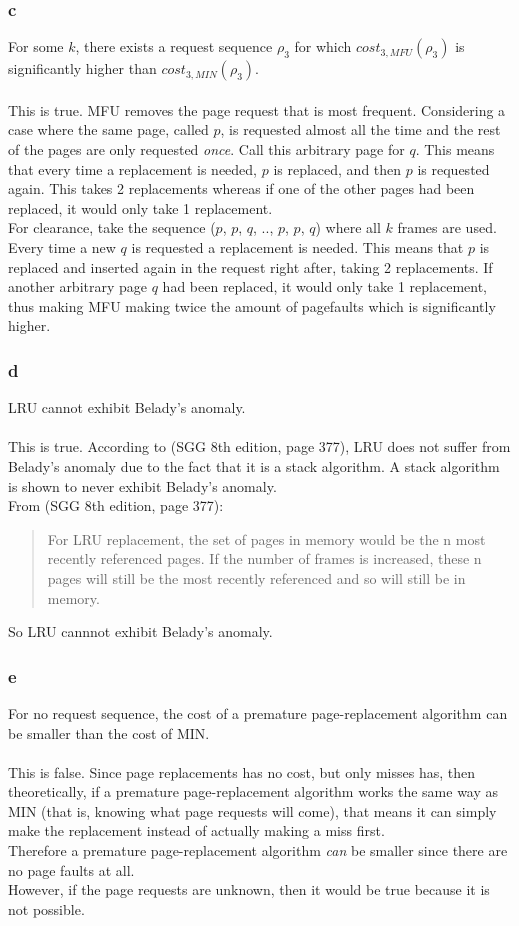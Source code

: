 \documentclass[12pt]{article}
\begin{document}
\subsubsection{c}
For some $k$, there exists a request sequence $\rho_3$ for which $cost_{3,MFU}(\rho_3)$ is significantly higher than $cost_{3,MIN}(\rho_3)$.\\
\\
This is true. MFU removes the page request that is most frequent. Considering a case where the same page, called $p$, is requested almost all the time and the rest of the pages are only requested \textit{once}. Call this arbitrary page for $q$. This means that every time a replacement is needed, $p$ is replaced, and then $p$ is requested again. This takes 2 replacements whereas if one of the other pages had been replaced, it would only take 1 replacement.\\
For clearance, take the sequence ($p$, $p$, $q$, .., $p$, $p$, $q$)  where all $k$ frames are used. Every time a new $q$ is requested a replacement is needed. This means that $p$ is replaced and inserted again in the request right after, taking 2 replacements. If another arbitrary page $q$ had been replaced, it would only take 1 replacement, thus making MFU making twice the amount of pagefaults which is significantly higher.

\subsubsection{d}
LRU cannot exhibit Belady's anomaly.\\
\\
This is true. According to (SGG 8th edition, page 377), LRU does not suffer from Belady's anomaly due to the fact that it is a stack algorithm. A stack algorithm is shown to never exhibit Belady's anomaly.\\
From (SGG 8th edition, page 377):
\begin{quote}
For LRU replacement, the set of pages in memory would be the n most
recently referenced pages. If the number of frames is increased, these n pages
will still be the most recently referenced and so will still be in memory.
\end{quote}
So LRU cannnot exhibit Belady's anomaly.

\subsubsection{e}
For no request sequence, the cost of a premature page-replacement algorithm can be smaller than the cost of MIN.\\
\\
This is false. Since page replacements has no cost, but only misses has, then theoretically, if a premature page-replacement algorithm works the same way as MIN (that is, knowing what page requests will come), that means it can simply make the replacement instead of actually making a miss first.\\
Therefore a premature page-replacement algorithm \textit{can} be smaller since there are no page faults at all.\\
However, if the page requests are unknown, then it would be true because it is not possible.
\end{document}
